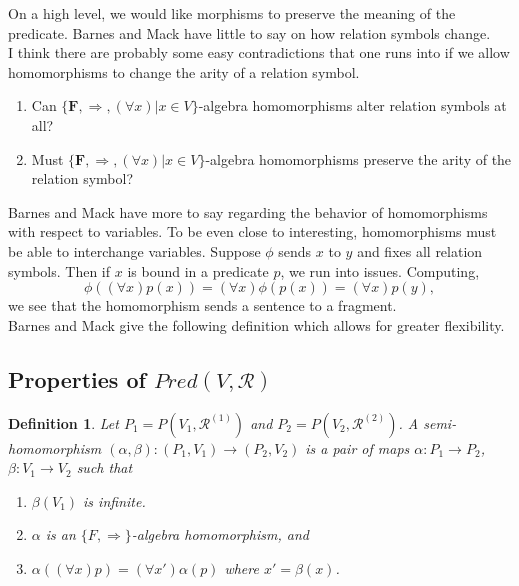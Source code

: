 \documentclass{article}
\theoremstyle{problemstyle}
\theoremstyle{lemmastyle}
\theoremstyle{theoremstyle}
\theoremstyle{problemstyle}
\newtheorem{definition}{Definition}
\theoremstyle{problemstyle}
\begin{document}
On a high level, we would like morphisms to preserve the meaning of the predicate. Barnes and Mack have little to say on how relation symbols change.\\

I think there are probably some easy contradictions that one runs into if we allow homomorphisms to change the arity of a relation symbol.  

\begin{enumerate}
\item Can $\{\textbf{F}, \Rightarrow, (\forall x) | x \in V\}$-algebra homomorphisms alter relation symbols at all?
\item Must $\{\textbf{F}, \Rightarrow, (\forall x) | x \in V\}$-algebra homomorphisms preserve the arity of the relation symbol?
\end{enumerate}

Barnes and Mack have more to say regarding the behavior of homomorphisms with respect to variables. To be even close to interesting, homomorphisms must be able to interchange variables. Suppose $\phi$ sends $x$ to $y$ and fixes all relation symbols. Then if $x$ is bound in a predicate $p$, we run into issues. Computing, $$\phi((\forall x)p(x)) = (\forall x)\phi(p(x)) = (\forall x)p(y),$$ we see that the homomorphism sends a sentence to a fragment.\\

Barnes and Mack give the following definition which allows for greater flexibility. 

\subsection*{Properties of $Pred(V,\mathscr{R})$}

\begin{definition}
Let $P_1 = P(V_1,\mathscr{R}^{(1)})$ and $P_2 = P(V_2,\mathscr{R}^{(2)})$. A \textit{semi-homomorphism} $(\alpha,\beta):(P_1,V_1) \rightarrow (P_2,V_2)$ is a pair of maps $\alpha:P_1 \rightarrow P_2$, $\beta:V_1 \rightarrow V_2$ such that 
\begin{enumerate}
\item $\beta(V_1)$ is infinite. 
\item $\alpha$ is an $\{F, \Rightarrow\}$-algebra homomorphism, and 
\item $\alpha((\forall x)p) = (\forall x')\alpha(p)$ where $x' = \beta(x)$.  
\end{enumerate}
\end{definition}
\end{document}
